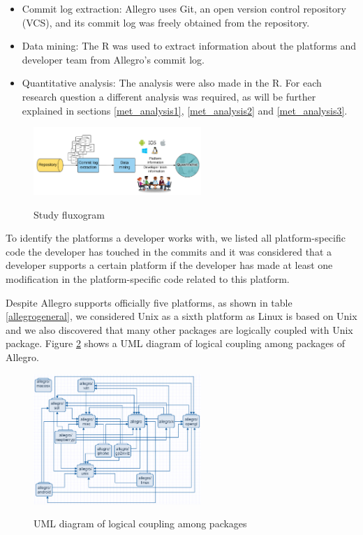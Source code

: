 \documentclass[10pt, conference]{IEEEtran}
\begin{document}
\begin{itemize}
\item Commit log extraction: Allegro uses Git, an open version control repository (VCS), and its commit log was freely obtained from the repository.
\item  Data mining: The R was used to extract information about the platforms and developer team from Allegro's commit log. 
\item Quantitative analysis: The analysis were also made in the R. For each research question a different analysis was required, as will be further explained in sections \ref{met_analysis1}, \ref{met_analysis2} and \ref{met_analysis3}.
\end{itemize}

\begin{figure}[h]
\centering
\textbf{}\includegraphics[width=2.5in]{metodologia}
\caption{Study fluxogram}
\label{metodologia}
\end{figure}

To identify the platforms a developer works with, we listed all platform-specific code the developer has touched in the commits and it was considered that a developer supports a certain platform if the developer has made at least one modification in the platform-specific code related to this platform.


Despite Allegro supports officially five platforms, as shown in table \ref{allegrogeneral}, we considered Unix as a sixth platform as Linux is based on Unix and we also discovered that many other packages are logically coupled with Unix package. Figure \ref{diagrama} shows a UML diagram of logical coupling among packages of Allegro. 

\begin{figure}[h]
\centering
\textbf{}\includegraphics[width=2.5in]{diagrama}
\caption{UML diagram of logical coupling among packages}
\label{diagrama}
\end{figure} 
\end{document}
